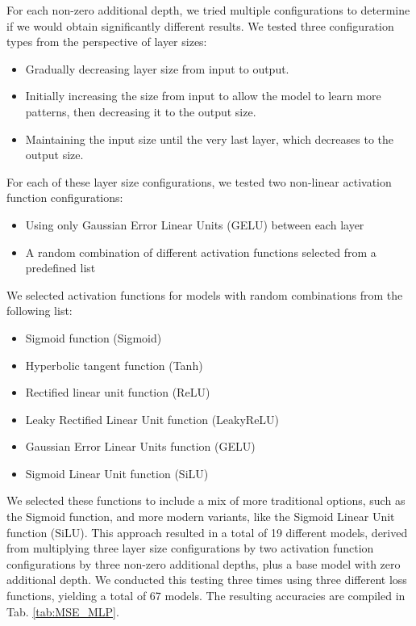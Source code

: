 For each non-zero additional depth, we tried multiple configurations to determine if we would obtain significantly different results. We tested three configuration types from the perspective of layer sizes:

\begin{itemize}
	\item Gradually decreasing layer size from input to output.
	\item Initially increasing the size from input to allow the model to learn more patterns, then decreasing it to the output size.
	\item Maintaining the input size until the very last layer, which decreases to the output size.
\end{itemize}

For each of these layer size configurations, we tested two non-linear activation function configurations:

\begin{itemize}
	\item Using only Gaussian Error Linear Units (GELU) between each layer
	\item A random combination of different activation functions selected from a predefined list
\end{itemize}

We selected activation functions for models with random combinations from the following list:

\begin{itemize}
	\item Sigmoid function (Sigmoid)
	\item Hyperbolic tangent function (Tanh)
	\item Rectified linear unit function (ReLU)
	\item Leaky Rectified Linear Unit function (LeakyReLU)
	\item Gaussian Error Linear Units function (GELU)
	\item Sigmoid Linear Unit function (SiLU)
\end{itemize}

We selected these functions to include a mix of more traditional options, such as the Sigmoid function, and more modern variants, like the Sigmoid Linear Unit function (SiLU). This approach resulted in a total of 19 different models, derived from multiplying three layer size configurations by two activation function configurations by three non-zero additional depths, plus a base model with zero additional depth. We conducted this testing three times using three different loss functions, yielding a total of 67 models. The resulting accuracies are compiled in Tab. \ref{tab:MSE_MLP}.
\\



